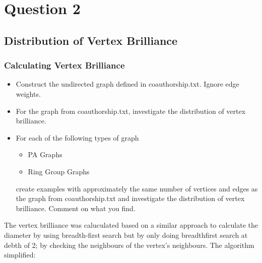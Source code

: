 \documentclass[11pt,a4paper,notitlepage]{article}
\begin{document}
\section*{Question 2}
\subsection*{Distribution of Vertex Brilliance}
\subsubsection*{Calculating Vertex Brilliance}
\begin{itemize}
    \item Construct the undirected graph defined in coauthorship.txt. Ignore edge weights.
    \item For the graph from coauthorship.txt, investigate the distribution of vertex brilliance. 
    \item For each of the following types of graph
    \begin{itemize}
    \item PA Graphs
    \item Ring Group Graphs 
    \end{itemize}
    create examples with approximately the same number of vertices and edges as the graph from coauthorship.txt and investigate the distribution of vertex brilliance. Comment on what you find.
\end{itemize}
The vertex brilliance was caluculated based on a similar approach to calculate the diameter by using breadth-first search but by only doing breadthfirst search at debth of 2; by checking the neighbours of the vertex's neighbours. The algorithm simplified:
\end{document}
